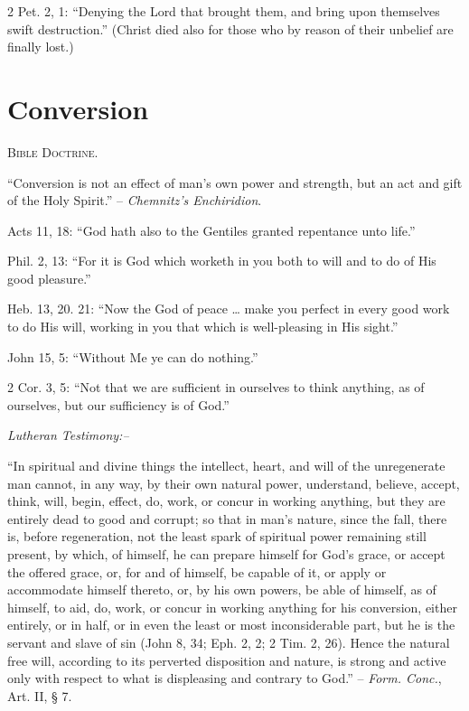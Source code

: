 \documentclass[
]{book}
\begin{document}
2 Pet. 2, 1: ``Denying the Lord that brought them, and bring upon themselves swift destruction.'' (Christ died also for those who by reason of their unbelief are finally lost.)

\section{\texorpdfstring{Conversion}{Conversion}}\label{conversion}

\begin{center}
\textsc{Bible Doctrine.}
\end{center}

``Conversion is not an effect of man's own power and strength, but an act and gift of the Holy Spirit.'' -- \emph{Chemnitz's Enchiridion}.

Acts 11, 18: ``God hath also to the Gentiles granted repentance unto life.''

Phil. 2, 13: ``For it is God which worketh in you both to will and to do of His good pleasure.''

Heb. 13, 20. 21: ``Now the God of peace \ldots{} make you perfect in every good work to do His will, working in you that which is well-pleasing in His sight.''

John 15, 5: ``Without Me ye can do nothing.''

2 Cor. 3, 5: ``Not that we are sufficient in ourselves to think anything, as of ourselves, but our sufficiency is of God.''

\begin{center}
\textsl{Lutheran Testimony:--}
\end{center}

``In spiritual and divine things the intellect, heart, and will of the unregenerate man cannot, in any way, by their own natural power, understand, believe, accept, think, will, begin, effect, do, work, or concur in working anything, but they are entirely dead to good and corrupt; so that in man's nature, since the fall, there is, before regeneration, not the least spark of spiritual power remaining still present, by which, of himself, he can prepare himself for God's grace, or accept the offered grace, or, for and of himself, be capable of it, or apply or accommodate himself thereto, or, by his own powers, be able of himself, as of himself, to aid, do, work, or concur in working anything for his conversion, either entirely, or in half, or in even the least or most inconsiderable part, but he is the servant and slave of sin (John 8, 34; Eph. 2, 2; 2 Tim. 2, 26). Hence the natural free will, according to its perverted disposition and nature, is strong and active only with respect to what is displeasing and contrary to God.'' -- \emph{Form. Conc.}, Art. II, § 7.
\end{document}
